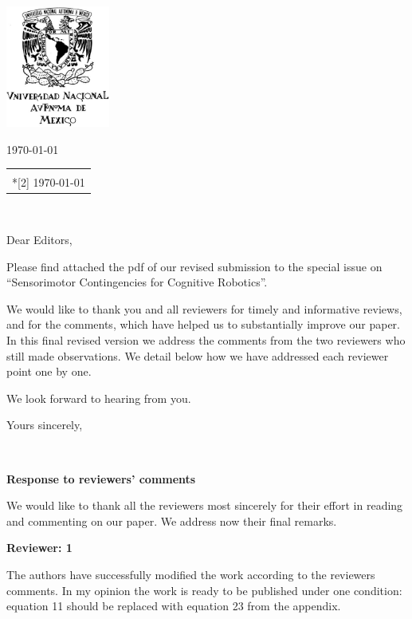 \documentclass[letterpaper,12pt]{letter}
\author{Verónica Esther Arriola Ríos}
\makeatletter
\renewcommand*{\opening}[2]{\ifx\@empty\fromaddress
 \thispagestyle{firstpage}%
 {\raggedleft#2\par}%
 \else %
 \thispagestyle{empty}%
 {\raggedleft\begin{tabular}{l@{}}\ignorespaces
 \fromaddress \\*[2\parskip]%
 #2 \end{tabular}\par}%
 \fi
 \vspace{10\parskip}%
 {\raggedright \toname \\ \toaddress \par}%
 \vspace{2\parskip}%
 #1\par\nobreak}
\makeatother
\begin{document}
\begin{letter}{\textbf{}}
\includegraphics[height=4cm, keepaspectratio=true]{escudo_UNAM.jpg}\vspace*{-4cm}

\address{Universidad Nacional Autónoma de México\\ Facultad de Ciencias,\\ Departamento de Matemáticas,\\ México, D.F.}

\opening{Dear Editors,}{\today}
\vspace{1cm}

Please find attached the pdf of our revised submission to the special issue on “Sensorimotor Contingencies for Cognitive Robotics”. 

We would like to thank you and all reviewers for timely and informative reviews, and for the comments, which have helped us to substantially improve our paper. In this final revised version we address the comments from the two reviewers who still made observations. We detail below how we have addressed each reviewer point one by one.

We look forward to hearing from you.


\vspace{1cm}

\signature{Verónica E. Arriola-Rios\\
Jeremy L Wyatt}

\closing{Yours sincerely,}


\end{letter}

\textbf{Response to reviewers’ comments}

We would like to thank all the reviewers most sincerely for their effort in reading and commenting on our paper.  We address now their final remarks.

\textbf{Reviewer: 1}

{\calligra\large The authors have successfully modified the work according to the reviewers comments. In my opinion the work is ready to be published under one condition: equation 11 should be replaced with equation 23 from the appendix.}
\end{document}
